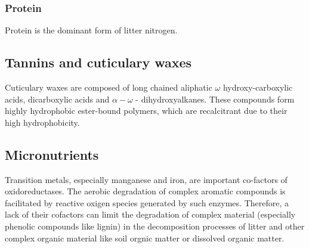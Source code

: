 


\subsubsection{Protein}

Protein is the dominant form of litter nitrogen. 

\subsection{Tannins and cuticulary waxes}
Cuticulary waxes are composed of long chained aliphatic $\omega$ hydroxy-carboxylic acids, dicarboxylic acids and  $\alpha -\omega$ -  dihydroxyalkanes. These compounds form highly hydrophobic ester-bound polymers, which are recalcitrant due to their high hydrophobicity. 




\subsection{Micronutrients}

Transition metals, especially manganese and iron, are important co-factors of oxidoreductases. The aerobic degradation of complex aromatic compounds is facilitated by reactive oxigen species generated by such enzymes. Therefore, a lack of their cofactors can limit the degradation of complex material (especially phenolic compounds like lignin) in the decomposition processes of litter and other complex organic material like soil orgnic matter or dissolved organic matter.



